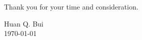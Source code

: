 \documentclass[12pt]{article}
\begin{document}
\noindent Thank you for your time and consideration.\\ \vspace{-10pt}

\noindent Huan Q. Bui\\
\today


%	
%	 

	

















	
	
	
	
	
\end{document}
